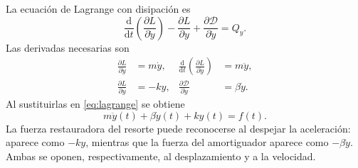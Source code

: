 La ecuación de Lagrange con disipación es
\begin{equation}
  \frac{\mathrm{d}}{\mathrm{d}t}
  \left(\frac{\partial L}{\partial \dot y}\right)
  -\frac{\partial L}{\partial y}
  +\frac{\partial\mathcal{D}}{\partial\dot y}
  =Q_y.
  \label{eq:lagrange}
\end{equation}
Las derivadas necesarias son
\begin{align}
  \frac{\partial L}{\partial\dot y} &= m\dot y,
  &\frac{\mathrm{d}}{\mathrm{d}t}
  \left(\frac{\partial L}{\partial\dot y}\right) &= m\ddot y,\\
  \frac{\partial L}{\partial y} &= -ky,
  &\frac{\partial\mathcal D}{\partial\dot y} &= \beta\dot y.
\end{align}
Al sustituirlas en \eqref{eq:lagrange} se obtiene
\begin{equation}
  \boxed{m\ddot y(t)+\beta\dot y(t)+ky(t)=f(t)}.
  \label{eq:movimiento}
\end{equation}
La fuerza restauradora del resorte puede reconocerse al despejar la aceleración: aparece como $-ky$, mientras que la fuerza del amortiguador aparece como $-\beta\dot y$. Ambas se oponen, respectivamente, al desplazamiento y a la velocidad.

